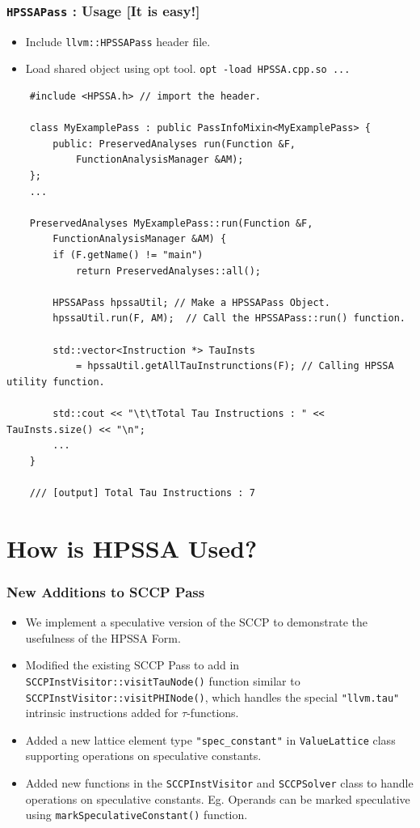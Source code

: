 \documentclass{beamer}
\begin{document}
\begin{frame}[fragile]
	\frametitle{\texttt{HPSSAPass} : Usage [It is easy!]}
	\begin{itemize}
		\item Include \texttt{llvm::HPSSAPass} header file.
		\item Load shared object using opt tool. \texttt{opt -load HPSSA.cpp.so ...} 
	\end{itemize}
	\begin{verbatim}
	#include <HPSSA.h> // import the header.
	
	class MyExamplePass : public PassInfoMixin<MyExamplePass> {
		public: PreservedAnalyses run(Function &F, 
			FunctionAnalysisManager &AM);
	};
	...
	
	PreservedAnalyses MyExamplePass::run(Function &F, 
		FunctionAnalysisManager &AM) {
		if (F.getName() != "main")
			return PreservedAnalyses::all();
	
		HPSSAPass hpssaUtil; // Make a HPSSAPass Object.
		hpssaUtil.run(F, AM);  // Call the HPSSAPass::run() function.
	
		std::vector<Instruction *> TauInsts 
			= hpssaUtil.getAllTauInstrunctions(F); // Calling HPSSA utility function.
			
		std::cout << "\t\tTotal Tau Instructions : " << TauInsts.size() << "\n";
		...
	}
	
	/// [output] Total Tau Instructions : 7 
	\end{verbatim}
\end{frame}

\section{How is HPSSA Used?}

\begin{frame}
	\frametitle{New Additions to SCCP Pass}
	\begin{itemize}
		\item We implement a speculative version of the SCCP to demonstrate the usefulness of the HPSSA Form.
		\item Modified the existing SCCP Pass to add in \texttt{SCCPInstVisitor::visitTauNode()} function similar to \texttt{SCCPInstVisitor::visitPHINode()}, which handles the special \texttt{"llvm.tau"} intrinsic instructions added for $\tau$-functions.
		\item Added a new lattice element type \texttt{"spec_constant"} in \texttt{ValueLattice} class supporting operations on speculative constants. 
		\item Added new functions in the \texttt{SCCPInstVisitor} and \texttt{SCCPSolver} class to handle operations on speculative constants. Eg. Operands can be marked speculative using \texttt{markSpeculativeConstant()} function.
	\end{itemize}
\end{frame}
\end{document}
